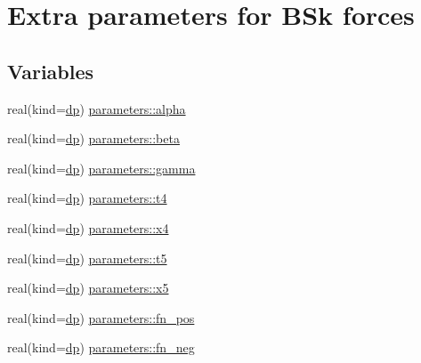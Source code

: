 \hypertarget{group__BSK__EXTRA__PARS}{}\section{Extra parameters for B\+Sk forces}
\label{group__BSK__EXTRA__PARS}
\subsection*{Variables}
\begin{DoxyCompactItemize}
\item 
real(kind=\mbox{\hyperlink{namespaceparameters_a52f8c6351fd79345d8811e065bcbbb37}{dp}}) \mbox{\hyperlink{group__BSK__EXTRA__PARS_ga8490c300b1682aacdb076ab6349e11b0}{parameters\+::alpha}}
\item 
real(kind=\mbox{\hyperlink{namespaceparameters_a52f8c6351fd79345d8811e065bcbbb37}{dp}}) \mbox{\hyperlink{group__BSK__EXTRA__PARS_ga7c930f664bb545cbbdf20ca315bd20d8}{parameters\+::beta}}
\item 
real(kind=\mbox{\hyperlink{namespaceparameters_a52f8c6351fd79345d8811e065bcbbb37}{dp}}) \mbox{\hyperlink{group__BSK__EXTRA__PARS_ga1baca96d21c6817998a6c1bfadb8645b}{parameters\+::gamma}}
\item 
real(kind=\mbox{\hyperlink{namespaceparameters_a52f8c6351fd79345d8811e065bcbbb37}{dp}}) \mbox{\hyperlink{group__BSK__EXTRA__PARS_ga8e9070bc00ffb35cb30d29a2cdb4cb7d}{parameters\+::t4}}
\item 
real(kind=\mbox{\hyperlink{namespaceparameters_a52f8c6351fd79345d8811e065bcbbb37}{dp}}) \mbox{\hyperlink{group__BSK__EXTRA__PARS_ga48ff3471242a75ae841f4090057d5dda}{parameters\+::x4}}
\item 
real(kind=\mbox{\hyperlink{namespaceparameters_a52f8c6351fd79345d8811e065bcbbb37}{dp}}) \mbox{\hyperlink{group__BSK__EXTRA__PARS_gacca0e8bacd6526d5199e62df3e41b416}{parameters\+::t5}}
\item 
real(kind=\mbox{\hyperlink{namespaceparameters_a52f8c6351fd79345d8811e065bcbbb37}{dp}}) \mbox{\hyperlink{group__BSK__EXTRA__PARS_gac03740f2430e82863d9084708f78d297}{parameters\+::x5}}
\item 
real(kind=\mbox{\hyperlink{namespaceparameters_a52f8c6351fd79345d8811e065bcbbb37}{dp}}) \mbox{\hyperlink{group__BSK__EXTRA__PARS_ga6fd9de4a6f08fe29d2edb25db8ff5b9a}{parameters\+::fn\+\_\+pos}}
\item 
real(kind=\mbox{\hyperlink{namespaceparameters_a52f8c6351fd79345d8811e065bcbbb37}{dp}}) \mbox{\hyperlink{group__BSK__EXTRA__PARS_ga00dd6368c3084b28b39f9ca851465592}{parameters\+::fn\+\_\+neg}}

\end{DoxyCompactItemize}
